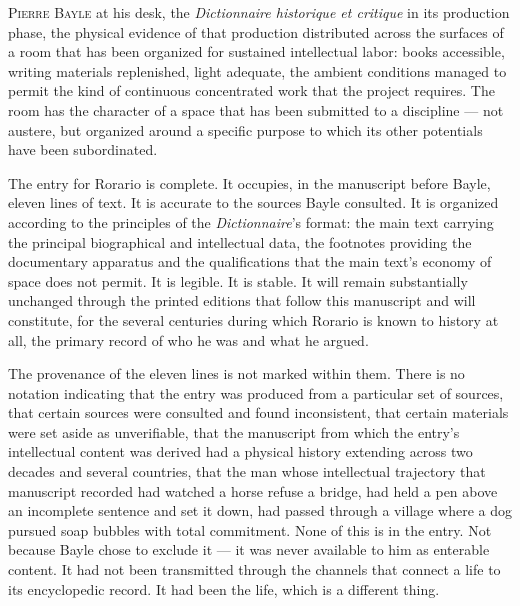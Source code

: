 \documentclass[12pt, oneside]{article}
\newenvironment{action}{%
  \vspace{0.6em}%
  \noindent\ignorespaces%
}{%
  \par\vspace{0.6em}%
}
\begin{document}
\begin{action}
\textsc{Pierre Bayle} at his desk, the \textit{Dictionnaire historique et critique} in its production phase, the physical evidence of that production distributed across the surfaces of a room that has been organized for sustained intellectual labor: books accessible, writing materials replenished, light adequate, the ambient conditions managed to permit the kind of continuous concentrated work that the project requires. The room has the character of a space that has been submitted to a discipline --- not austere, but organized around a specific purpose to which its other potentials have been subordinated.

The entry for Rorario is complete. It occupies, in the manuscript before Bayle, eleven lines of text. It is accurate to the sources Bayle consulted. It is organized according to the principles of the \textit{Dictionnaire}'s format: the main text carrying the principal biographical and intellectual data, the footnotes providing the documentary apparatus and the qualifications that the main text's economy of space does not permit. It is legible. It is stable. It will remain substantially unchanged through the printed editions that follow this manuscript and will constitute, for the several centuries during which Rorario is known to history at all, the primary record of who he was and what he argued.

The provenance of the eleven lines is not marked within them. There is no notation indicating that the entry was produced from a particular set of sources, that certain sources were consulted and found inconsistent, that certain materials were set aside as unverifiable, that the manuscript from which the entry's intellectual content was derived had a physical history extending across two decades and several countries, that the man whose intellectual trajectory that manuscript recorded had watched a horse refuse a bridge, had held a pen above an incomplete sentence and set it down, had passed through a village where a dog pursued soap bubbles with total commitment. None of this is in the entry. Not because Bayle chose to exclude it --- it was never available to him as enterable content. It had not been transmitted through the channels that connect a life to its encyclopedic record. It had been the life, which is a different thing.
\end{action}
\end{document}
